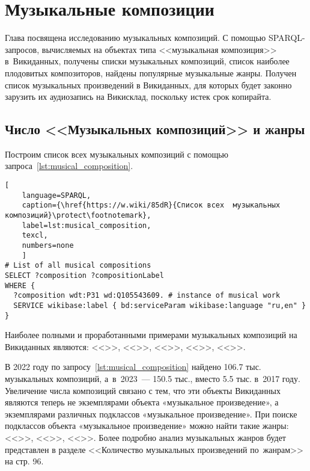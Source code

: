 \chapter{Музыкальные композиции}
\label{ch:musical-composition}
Глава посвящена исследованию музыкальных композиций. 
С помощью SPARQL-запросов, вычисляемых на объектах типа <<музыкальная композиция>> в~Викиданных, 
получены списки музыкальных композиций, список наиболее плодовитых композиторов, 
найдены популярные музыкальные жанры. 
Получен список музыкальных произведений в Викиданных, 
для которых будет законно зарузить их аудиозапись на Викисклад, поскольку истек срок копирайта.

\section{Число <<Музыкальных композиций>> и жанры}


Построим список всех музыкальных композиций с помощью запроса~\ref{lst:musical_composition}.

\begin{lstlisting}[ 
    language=SPARQL,
    caption={\href{https://w.wiki/85dR}{Список всех  музыкальных композиций}\protect\footnotemark},
    label=lst:musical_composition,
    texcl,
    numbers=none
    ]
# List of all musical compositions
SELECT ?composition ?compositionLabel 
WHERE {
  ?composition wdt:P31 wd:Q105543609. # instance of musical work
  SERVICE wikibase:label { bd:serviceParam wikibase:language "ru,en" }
}
\end{lstlisting}%

Наиболее полными и проработанными примерами музыкальных композиций на Викиданных являются: <<>>, <<>>, <<>>, <<>>, <<>>.

В 2022 году по запросу~\ref{lst:musical_composition} найдено \num{106,7} тыс. музыкальных композиций, 
а~в~2023~--- \num{150,5} тыс., вместо \num{5,5} тыс. в~2017 году. 
Увеличение числа композиций связано с тем, что эти объекты Викиданных являются теперь не экземплярами объекта «музыкальное произведение», а экземплярами различных подклассов «музыкальное произведение». При поиске подклассов объекта «музыкальное произведение» можно найти такие жанры: <<>>, <<>>, <<>>. Более подробно анализ музыкальных жанров будет представлен в разделе <<Количество музыкальных произведений по~жанрам>> на стр. 96.

